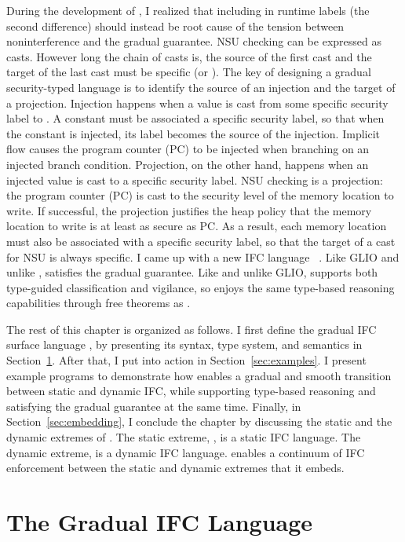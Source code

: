 {During the development of \SurfaceOld, I realized that including \unk in runtime
labels (the second difference) should instead be root cause of the tension
between noninterference and the gradual guarantee. NSU checking can be expressed
as casts. However long the chain of casts is, the source of the first cast and
the target of the last cast must be specific (\low or \high). The key of
designing a gradual security-typed language is to identify the source of an
injection and the target of a projection. Injection happens when a value is cast
from some specific security label to \unk. A constant must be associated a
specific security label, so that when the constant is injected, its label
becomes the source of the injection. Implicit flow causes the program counter
(PC) to be injected when branching on an injected branch condition. Projection,
on the other hand, happens when an injected value is cast to a specific security
label. NSU checking is a projection: the program counter (PC) is cast to the
security level of the memory location to write. If successful, the projection
justifies the heap policy that the memory location to write is at least as
secure as PC. As a result, each memory location must also be associated with a
specific security label, so that the target of a cast for NSU is always
specific. I came up with a new IFC language \Surface~\parencite{chen2024quest}.
Like GLIO and unlike \GSLRef, \Surface satisfies the gradual guarantee. Like
\GSLRef and unlike GLIO, \Surface supports both type-guided classification and
vigilance, so \Surface enjoys the same type-based reasoning capabilities through
free theorems as \GSLRef.

The rest of this chapter is organized as follows. I first define the gradual IFC
surface language \Surface, by presenting its syntax, type system, and semantics
in Section~\ref{sec:surface-def}. After that, I put \Surface into action in
Section~\ref{sec:examples}. I present example programs to demonstrate how
\Surface enables a gradual and smooth transition between static and dynamic IFC,
while supporting type-based reasoning and satisfying the gradual guarantee at
the same time. Finally, in Section~\ref{sec:embedding}, I conclude the chapter
by discussing the static and the dynamic extremes of \Surface. The static
extreme, \SSLRef, is a static IFC language. The dynamic extreme, \DynIFC is a
dynamic IFC language. \Surface enables a continuum of IFC enforcement between
the static and dynamic extremes that it embeds.
}  %

\section{The Gradual IFC Language \Surface}
\label{sec:surface-def}

